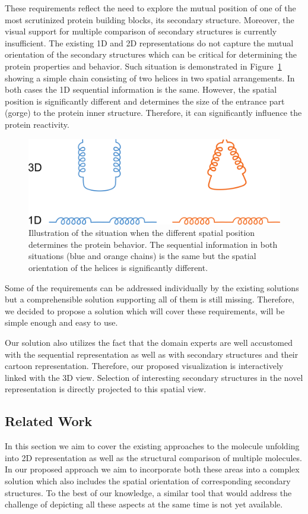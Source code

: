 \documentclass[twocolumn]{bmcart}%
\begin{document}
These requirements reflect the need to explore the mutual position of one of the most scrutinized protein building blocks, its secondary structure.
Moreover, the visual support for multiple comparison of secondary structures is currently insufficient.
The existing 1D and 2D representations do not capture the mutual orientation of the secondary structures which can be critical for determining the protein properties and behavior.
Such situation is demonstrated in Figure~\ref{fig:mutual_pos} showing a simple chain consisting of two helices in two spatial arrangements.
In both cases the 1D sequential information is the same.
However, the spatial position is significantly different and determines the size of the entrance part (gorge) to the protein inner structure.
Therefore, it can significantly influence the protein reactivity.

\begin{figure}[t!]
  \centering
  \includegraphics[width=0.9\columnwidth]{pics/angles.png}
  \caption{Illustration of the situation when the different spatial position determines the protein behavior. The sequential information in both situations (blue and orange chains) is the same but the spatial orientation of the helices is significantly different.}
  \label{fig:mutual_pos}
\end{figure}

Some of the requirements can be addressed individually by the existing solutions but a comprehensible solution supporting all of them is still missing.
Therefore, we decided to propose a solution which will cover these requirements, will be simple enough and easy to use. 

Our solution also utilizes the fact that the domain experts are well accustomed with the sequential representation as well as with secondary structures and their cartoon representation. 
Therefore, our proposed visualization is interactively linked with the 3D view.
Selection of interesting secondary structures in the novel representation is directly projected to this spatial view. 


\subsection*{Related Work}
In this section we aim to cover the existing approaches to the molecule unfolding into 2D representation as well as the structural comparison of multiple molecules.
In our proposed approach we aim to incorporate both these areas into a complex solution which also includes the spatial orientation of corresponding secondary structures.
To the best of our knowledge, a similar tool that would address the challenge of depicting all these aspects at the same time is not yet available. 
\end{document}
